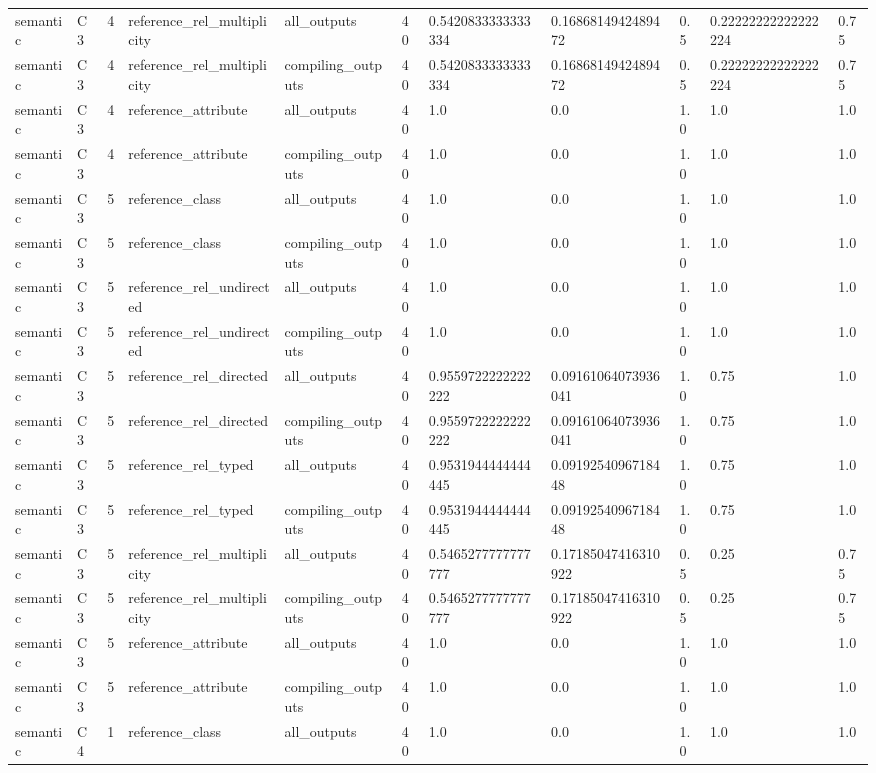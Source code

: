 \begin{tabular}{lllllllllll}
semantic & C3 & 4 & reference\_rel\_multiplicity & all\_outputs & 40 & 0.5420833333333334 & 0.1686814942489472 & 0.5 & 0.22222222222222224 & 0.75 \\
semantic & C3 & 4 & reference\_rel\_multiplicity & compiling\_outputs & 40 & 0.5420833333333334 & 0.1686814942489472 & 0.5 & 0.22222222222222224 & 0.75 \\
semantic & C3 & 4 & reference\_attribute & all\_outputs & 40 & 1.0 & 0.0 & 1.0 & 1.0 & 1.0 \\
semantic & C3 & 4 & reference\_attribute & compiling\_outputs & 40 & 1.0 & 0.0 & 1.0 & 1.0 & 1.0 \\
semantic & C3 & 5 & reference\_class & all\_outputs & 40 & 1.0 & 0.0 & 1.0 & 1.0 & 1.0 \\
semantic & C3 & 5 & reference\_class & compiling\_outputs & 40 & 1.0 & 0.0 & 1.0 & 1.0 & 1.0 \\
semantic & C3 & 5 & reference\_rel\_undirected & all\_outputs & 40 & 1.0 & 0.0 & 1.0 & 1.0 & 1.0 \\
semantic & C3 & 5 & reference\_rel\_undirected & compiling\_outputs & 40 & 1.0 & 0.0 & 1.0 & 1.0 & 1.0 \\
semantic & C3 & 5 & reference\_rel\_directed & all\_outputs & 40 & 0.9559722222222222 & 0.09161064073936041 & 1.0 & 0.75 & 1.0 \\
semantic & C3 & 5 & reference\_rel\_directed & compiling\_outputs & 40 & 0.9559722222222222 & 0.09161064073936041 & 1.0 & 0.75 & 1.0 \\
semantic & C3 & 5 & reference\_rel\_typed & all\_outputs & 40 & 0.9531944444444445 & 0.0919254096718448 & 1.0 & 0.75 & 1.0 \\
semantic & C3 & 5 & reference\_rel\_typed & compiling\_outputs & 40 & 0.9531944444444445 & 0.0919254096718448 & 1.0 & 0.75 & 1.0 \\
semantic & C3 & 5 & reference\_rel\_multiplicity & all\_outputs & 40 & 0.5465277777777777 & 0.17185047416310922 & 0.5 & 0.25 & 0.75 \\
semantic & C3 & 5 & reference\_rel\_multiplicity & compiling\_outputs & 40 & 0.5465277777777777 & 0.17185047416310922 & 0.5 & 0.25 & 0.75 \\
semantic & C3 & 5 & reference\_attribute & all\_outputs & 40 & 1.0 & 0.0 & 1.0 & 1.0 & 1.0 \\
semantic & C3 & 5 & reference\_attribute & compiling\_outputs & 40 & 1.0 & 0.0 & 1.0 & 1.0 & 1.0 \\
semantic & C4 & 1 & reference\_class & all\_outputs & 40 & 1.0 & 0.0 & 1.0 & 1.0 & 1.0 \\

\end{tabular}
